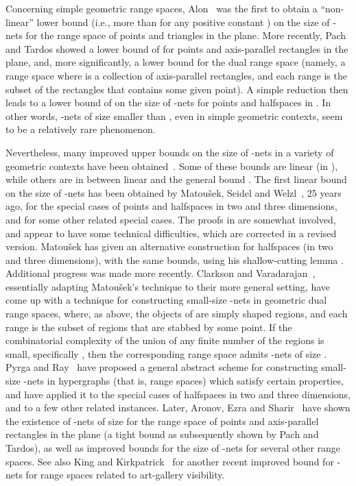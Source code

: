 \documentclass[12pt]{article}
\providecommand{\Matousek}{Matou{\v s}ek\xspace}
\begin{document}
Concerning simple geometric range spaces, Alon~\cite{a-nllbp-12} was
the first to obtain a ``non-linear'' lower bound (i.e., more than 
 for any positive constant ) on the size of -nets 
for the range space of points and triangles in the plane. More recently, 
Pach and Tardos \cite{pt-tlbse-13} showed a lower bound of 
 for points and axis-parallel
rectangles in the plane, and, more significantly, a lower bound
 for the dual range space 
(namely, a range space where  is a collection of axis-parallel rectangles, 
and each range is the subset of the rectangles that contains some given point).
A simple reduction then leads to a lower bound of 
 on the size 
of -nets for points and halfspaces in . 
In other words, -nets of size smaller than
, even in simple geometric
contexts, seem to be a relatively rare phenomenon.

Nevertheless, many improved upper bounds on the size of -nets in
a variety of geometric contexts have been
obtained~\cite{aes-ssena-10, cv-iaags-07, kk-iagsg-11, pr-nepen-08}. 
Some of these bounds are linear (in ), while
others are in between linear and the general bound
.  The first linear
bound on the size of -nets has been obtained by \Matousek,
Seidel and Welzl~\cite{msw-hnlls-90}, 25 years ago, for the special
cases of points and halfspaces in two and three dimensions, and for
some other related special cases. The proofs in \cite{msw-hnlls-90}
are somewhat involved, and appear to have some technical difficulties,
which are corrected in a revised version.  \Matousek has given an
alternative construction for halfspaces (in two and three dimensions),
with the same bounds, using his shallow-cutting lemma \cite{m-rph-92}.
Additional progress was made more recently.  Clarkson and
Varadarajan~\cite{cv-iaags-07}, essentially adapting \Matousek's
technique to their more general setting, have come up with a technique
for constructing small-size -nets in geometric dual range spaces,
where, as above, the objects of  are simply shaped regions, and each 
range is the subset of regions that are stabbed by some point.
If the combinatorial complexity of the union of any finite number  
of the regions is small, specifically , then the corresponding
range space admits -nets of size .
Pyrga and Ray~\cite{pr-nepen-08} have proposed a general abstract
scheme for constructing small-size -nets in hypergraphs (that
is, range spaces) which satisfy certain properties, and have applied
it to the special cases of halfspaces in two and three dimensions, and
to a few other related instances. Later, Aronov, Ezra and
Sharir~\cite{aes-ssena-10} have shown the existence of -nets of
size  for the
range space of points and axis-parallel rectangles in the plane 
(a tight bound as subsequently shown by Pach and Tardos), as well as 
improved bounds for the size of -nets for several other range spaces. 
See also King and Kirkpatrick~\cite{kk-iagsg-11} for another recent improved 
bound for -nets for range spaces related to art-gallery visibility.
\end{document}
